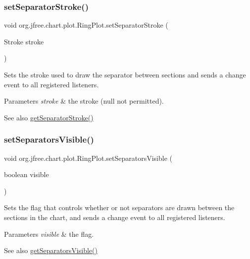 \subsubsection{\texorpdfstring{set\+Separator\+Stroke()}{setSeparatorStroke()}}
{\footnotesize\ttfamily void org.\+jfree.\+chart.\+plot.\+Ring\+Plot.\+set\+Separator\+Stroke (\begin{DoxyParamCaption}\item[{Stroke}]{stroke }\end{DoxyParamCaption})}

Sets the stroke used to draw the separator between sections and sends a change event to all registered listeners.


\begin{DoxyParams}{Parameters}
{\em stroke} & the stroke ({\ttfamily null} not permitted).\\
\hline
\end{DoxyParams}
\begin{DoxySeeAlso}{See also}
\mbox{\hyperlink{classorg_1_1jfree_1_1chart_1_1plot_1_1_ring_plot_a1282d5d06eadea106d5ce3b25cc5010e}{get\+Separator\+Stroke()}} 
\end{DoxySeeAlso}
\mbox{\label{classorg_1_1jfree_1_1chart_1_1plot_1_1_ring_plot_a9b60ddf9d8fc13eed9352ed8da3178e6}} 
\subsubsection{\texorpdfstring{set\+Separators\+Visible()}{setSeparatorsVisible()}}
{\footnotesize\ttfamily void org.\+jfree.\+chart.\+plot.\+Ring\+Plot.\+set\+Separators\+Visible (\begin{DoxyParamCaption}\item[{boolean}]{visible }\end{DoxyParamCaption})}

Sets the flag that controls whether or not separators are drawn between the sections in the chart, and sends a change event to all registered listeners.


\begin{DoxyParams}{Parameters}
{\em visible} & the flag.\\
\hline
\end{DoxyParams}
\begin{DoxySeeAlso}{See also}
\mbox{\hyperlink{classorg_1_1jfree_1_1chart_1_1plot_1_1_ring_plot_a759cfedb67a89fb268c0c1b77f6952d1}{get\+Separators\+Visible()}} 
\end{DoxySeeAlso}


